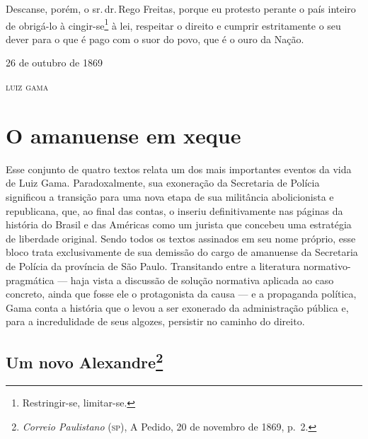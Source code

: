 Descanse, porém, o sr.\,dr.\,Rego Freitas, porque eu protesto perante o
país inteiro de obrigá-lo à cingir-se\footnote{Restringir-se,
  limitar-se.} à lei, respeitar o direito e cumprir estritamente o seu
dever para o que é pago com o suor do povo, que é o ouro da Nação.

\begin{flushright}
26 de outubro de 1869

\textsc{luiz gama}
\end{flushright}

\part{O amanuense em xeque} %

\begin{argumento}
Esse conjunto de quatro textos relata um dos mais importantes eventos da
vida de Luiz Gama. Paradoxalmente, sua exoneração da Secretaria de
Polícia significou a transição para uma nova etapa de sua militância
abolicionista e republicana, que, ao final das contas, o inseriu
definitivamente nas páginas da história do Brasil e das Américas como um
jurista que concebeu uma estratégia de liberdade original. Sendo todos
os textos assinados em seu nome próprio, esse bloco trata exclusivamente
de sua demissão do cargo de amanuense da Secretaria de Polícia da
província de São Paulo. Transitando entre a literatura
normativo-pragmática --- haja vista a discussão de solução normativa
aplicada ao caso concreto, ainda que fosse ele o protagonista da causa
--- e a propaganda política, Gama conta a história que o levou a ser
exonerado da administração pública e, para a incredulidade de seus
algozes, persistir no caminho do direito.
\end{argumento}

\chapter{Um novo Alexandre\footnote{\emph{Correio Paulistano} (\textsc{sp}), A
  Pedido, 20 de novembro de 1869, p.~2.}}

